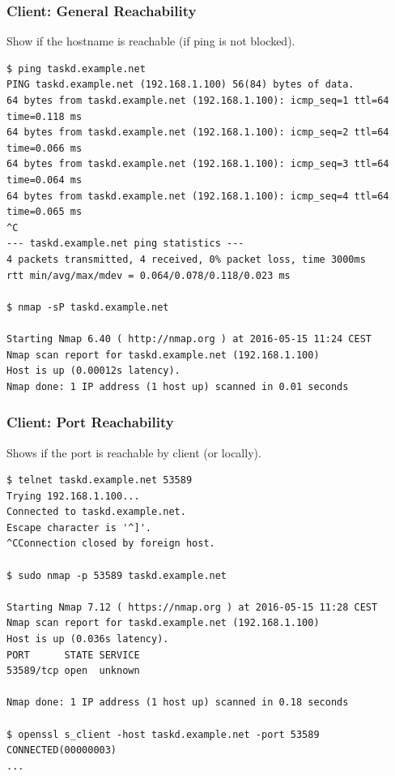 \documentclass[t,handout]{beamer}
\begin{document}
\begin{frame}[fragile]\frametitle{Client: General Reachability}\label{C1}
    \vfill
    Show if the hostname is reachable (if ping is not blocked).

    \begin{lstlisting}
$ ping taskd.example.net
PING taskd.example.net (192.168.1.100) 56(84) bytes of data.
64 bytes from taskd.example.net (192.168.1.100): icmp_seq=1 ttl=64 time=0.118 ms
64 bytes from taskd.example.net (192.168.1.100): icmp_seq=2 ttl=64 time=0.066 ms
64 bytes from taskd.example.net (192.168.1.100): icmp_seq=3 ttl=64 time=0.064 ms
64 bytes from taskd.example.net (192.168.1.100): icmp_seq=4 ttl=64 time=0.065 ms
^C
--- taskd.example.net ping statistics ---
4 packets transmitted, 4 received, 0% packet loss, time 3000ms
rtt min/avg/max/mdev = 0.064/0.078/0.118/0.023 ms

$ nmap -sP taskd.example.net

Starting Nmap 6.40 ( http://nmap.org ) at 2016-05-15 11:24 CEST
Nmap scan report for taskd.example.net (192.168.1.100)
Host is up (0.00012s latency).
Nmap done: 1 IP address (1 host up) scanned in 0.01 seconds\end{lstlisting}
    \vfill
\end{frame}

\begin{frame}[fragile]\frametitle{Client: Port Reachability}\label{C2}
    \vfill
    Shows if the port is reachable by client (or locally).

    \begin{lstlisting}
$ telnet taskd.example.net 53589
Trying 192.168.1.100...
Connected to taskd.example.net.
Escape character is '^]'.
^CConnection closed by foreign host.

$ sudo nmap -p 53589 taskd.example.net

Starting Nmap 7.12 ( https://nmap.org ) at 2016-05-15 11:28 CEST
Nmap scan report for taskd.example.net (192.168.1.100)
Host is up (0.036s latency).
PORT      STATE SERVICE
53589/tcp open  unknown

Nmap done: 1 IP address (1 host up) scanned in 0.18 seconds

$ openssl s_client -host taskd.example.net -port 53589
CONNECTED(00000003)
...\end{lstlisting}

    \vfill
\end{frame}
\end{document}
